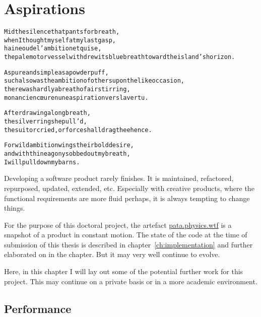 
\chapter{Aspirations}
\label{ch:future}

\startcontents[chapters]

\vfill

\begin{alltt}\sffamily
Mid the silence that pants for breath,
when I thought myself at my last gasp,
haine ou de l'ambition et qui se,
the pale motor vessel withdrew its blue breath toward the island's horizon.

As pure and simple as a powder puff,
such also was the ambition of others upon the like occasion,
there was hardly a breath of air stirring,
mon ancien cœur en une aspiration vers la vertu.

After drawing a long breath,
the silver ring she pull'd,
the suitor cried, or force shall drag thee hence.

For wild ambition wings their bold desire,
and with thine agony sobbed out my breath,
I will pull down my barns.
\end{alltt}

\newpage
\minicontents
\spirals


Developing a software product rarely finishes. It is maintained, refactored, repurposed, updated, extended, etc. Especially with creative products, where the functional requirements are more fluid perhaps, it is always tempting to change things. 

For the purpose of this doctoral project, the artefact \url{pata.physics.wtf} is a snapshot of a product in constant motion. The state of the code at the time of submission of this thesis is described in chapter~\ref{ch:implementation} and further elaborated on in the  chapter. But it may very well continue to evolve.

Here, in this chapter I will lay out some of the potential further work for this project. This may continue on a private basis or in a more academic environment. 


\section{Performance}

